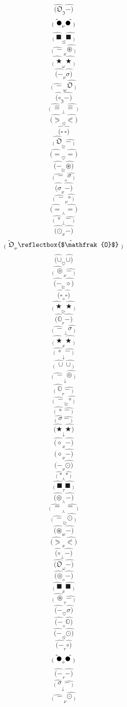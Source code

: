 \documentclass[12pt]{article}
\begin{document}
\begin{multicols}{5}
$$\hat{(\mathfrak{O}} _\mathfrak{I} \hat{-)}$$
$$\hat{_( \ \newmoon} _\nu \hat{\newmoon\ _)}$$
$$\hat{_( \ \blacksquare} _\trianglelefteq \hat{\blacksquare\ _)}$$
$$\hat{_( \ -} _x \hat{\circledast\ _)}$$
$$\hat{_( \ \bigstar} _\omega \hat{\bigstar\ _)}$$
$$\hat{(-} _\nu \hat{\sigma)}$$
$$\hat{_( \ -} _w \hat{\mathfrak{O}\ _)}$$
$$\hat{(\circ} _\mathfrak{I} \hat{-)}$$
$$\hat{_( \ \equiv} _\bot \hat{\equiv\ _)}$$
$$\hat{(\eqslantgtr} _\trianglelefteq \hat{\eqslantless)}$$
$$\hat{(\square} \  \hat{\square)}$$
$$\hat{_( \ \mathfrak{O}} _\trianglerighteq \hat{-\ _)}$$
$$\hat{(=} _\heartsuit \hat{=)}$$
$$\hat{(-} _\trianglerighteq \hat{\circledast)}$$
$$\hat{_( \ -} _\diamond \hat{\sigma\ _)}$$
$$\hat{(\sigma} _x \hat{-)}$$
$$\hat{_( \ -} _\nu \hat{\circ\ _)}$$
$$\hat{(=} _\curlywedge \hat{=)}$$
$$\hat{_( \ \circ} _\bot \hat{-\ _)}$$
$$\hat{(\odot} _x \hat{-)}$$
$$\hat{_( \ \mathfrak{O}} _\nu \hat{\reflectbox{$\mathfrak{O}$}\ _)}$$
$$\hat{(\cup} _\heartsuit \hat{\cup)}$$
$$\hat{_( \ \circledcirc} _\nu \hat{-\ _)}$$
$$\hat{(-} _\trianglerighteq \hat{\diamond)}$$
$$\hat{(\square} _\diamond \hat{\square)}$$
$$\hat{_( \ \bigstar} _\trianglerighteq \hat{\bigstar\ _)}$$
$$\hat{(\mathbb{O}} _r \hat{-)}$$
$$\hat{_( \ -} _\bot \hat{\sigma\ _)}$$
$$\hat{_( \ \bigstar} _x \hat{\bigstar\ _)}$$
$$\hat{_( \ \circ} _\downarrow \hat{-\ _)}$$
$$\hat{_( \ \cup} \  \hat{\cup\ _)}$$
$$\hat{_( \ -} _\downarrow \hat{\circledcirc\ _)}$$
$$\hat{_( \ \mathbb{O}} _r \hat{-\ _)}$$
$$\hat{_( \ -} _\trianglerighteq \hat{\circ\ _)}$$
$$\hat{_( \ \circ} \  \hat{-\ _)}$$
$$\hat{_( \ \sigma} \  \hat{-\ _)}$$
$$\hat{(\bigstar} _\downarrow \hat{\bigstar)}$$
$$\hat{(\diamond} _x \hat{-)}$$
$$\hat{(\diamond} _\nu \hat{-)}$$
$$\hat{(-} _\nu \hat{\odot)}$$
$$\hat{_( \ \square} _\curlywedge \hat{\square\ _)}$$
$$\hat{_( \ \blacksquare} _\tau \hat{\blacksquare\ _)}$$
$$\hat{(\circledcirc} _\curlywedge \hat{-)}$$
$$\hat{_( \ =} _\curlywedge \hat{=\ _)}$$
$$\hat{_( \ -} _\trianglerighteq \hat{\odot\ _)}$$
$$\hat{(\circledast} _w \hat{-)}$$
$$\hat{(\eqslantgtr} _x \hat{\eqslantless)}$$
$$\hat{(\circ} _\bot \hat{-)}$$
$$\hat{(\mathfrak{O}} _\omega \hat{-)}$$
$$\hat{(\circledcirc} _\diamond \hat{-)}$$
$$\hat{_( \ \blacksquare} _x \hat{\blacksquare\ _)}$$
$$\hat{_( \ \circledast} _\tau \hat{-\ _)}$$
$$\hat{(-} _\heartsuit \hat{\sigma)}$$
$$\hat{(-} _\diamond \hat{\mathbb{O})}$$
$$\hat{(-} _\trianglelefteq \hat{\odot)}$$
$$\hat{(-} _r \hat{\circ)}$$
$$\hat{_( \ \newmoon} _\diamond \hat{\newmoon\ _)}$$
$$\hat{(-} _r \hat{-)}$$
$$\hat{_( \ \sigma} _\downarrow \hat{-\ _)}$$
$$\hat{_( \ -} _\nu \hat{\odot\ _)}$$

\end{multicols}
\end{document}
